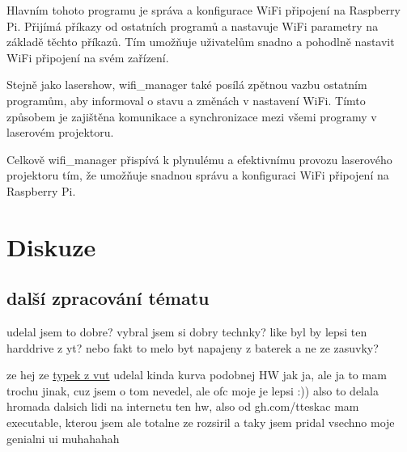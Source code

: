 \documentclass{template/socthesis}
\begin{document}
Hlavním tohoto programu je správa a konfigurace WiFi připojení na Raspberry Pi. Přijímá příkazy od ostatních programů a nastavuje WiFi parametry na základě těchto příkazů. Tím umožňuje uživatelům snadno a pohodlně nastavit WiFi připojení na svém zařízení.

Stejně jako lasershow, wifi\_manager také posílá zpětnou vazbu ostatním programům, aby informoval o stavu a změnách v nastavení WiFi. Tímto způsobem je zajištěna komunikace a synchronizace mezi všemi programy v laserovém projektoru.

Celkově wifi\_manager přispívá k plynulému a efektivnímu provozu laserového projektoru tím, že umožňuje snadnou správu a konfiguraci WiFi připojení na Raspberry Pi.

\chapter{Diskuze}
\section{další zpracování tématu}
udelal jsem to dobre? vybral jsem si dobry technky?
like byl by lepsi ten harddrive z yt?
nebo fakt to melo byt napajeny z baterek a ne ze zasuvky?

ze hej ze \href{https://dspace.vutbr.cz/bitstream/handle/11012/38621/final-thesis.pdf?sequence=-1}{typek z vut} udelal kinda kurva podobnej HW jak ja, ale ja to mam trochu jinak, cuz jsem o tom nevedel, ale ofc moje je lepsi :))
also to delala hromada dalsich lidi na internetu ten hw, also od gh.com/tteskac mam executable, kterou jsem ale totalne ze rozsiril a taky jsem pridal vsechno moje genialni ui muhahahah
\end{document}
